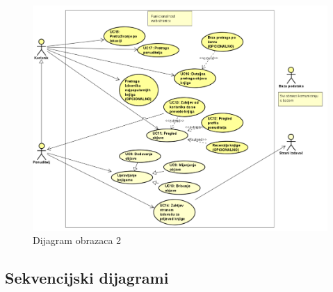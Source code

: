 				\begin{figure}
    					\centering
    					\includegraphics[width = \textwidth]{slike/DO2}
    					\caption{Dijagram obrazaca 2}
    					\label{fig:Dijagram obrazaca 2}
				\end{figure}
				\eject	
					
	
				
			\subsection{Sekvencijski dijagrami}
				
